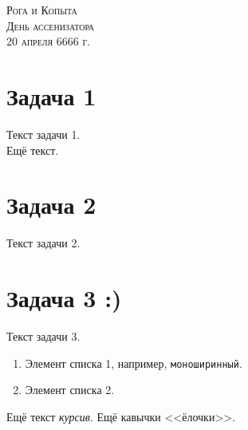 \documentclass[a4paper,12pt]{article}
\begin{document}
\textsc{Рога и Копыта} \\
\textsc{День ассенизатора} \\
\textsc{20 апреля 6666 г.}

\section{Задача 1}

Текст задачи 1.\\

Ещё текст.

\section{Задача 2}

Текст задачи 2.

\section{Задача 3 :)}

Текст задачи 3.

\begin{enumerate}
  \item Элемент списка 1, например, {\tt моноширинный}.
  \item Элемент списка 2.
\end{enumerate}

Ещё текст \emph{курсив}.
Ещё кавычки <<ёлочки>>.
\end{document}
